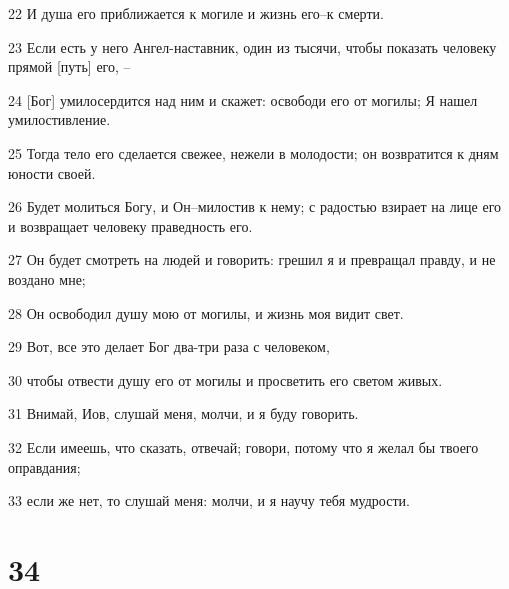 \par 22 И душа его приближается к могиле и жизнь его--к смерти.
\par 23 Если есть у него Ангел-наставник, один из тысячи, чтобы показать человеку прямой [путь] его, --
\par 24 [Бог] умилосердится над ним и скажет: освободи его от могилы; Я нашел умилостивление.
\par 25 Тогда тело его сделается свежее, нежели в молодости; он возвратится к дням юности своей.
\par 26 Будет молиться Богу, и Он--милостив к нему; с радостью взирает на лице его и возвращает человеку праведность его.
\par 27 Он будет смотреть на людей и говорить: грешил я и превращал правду, и не воздано мне;
\par 28 Он освободил душу мою от могилы, и жизнь моя видит свет.
\par 29 Вот, все это делает Бог два-три раза с человеком,
\par 30 чтобы отвести душу его от могилы и просветить его светом живых.
\par 31 Внимай, Иов, слушай меня, молчи, и я буду говорить.
\par 32 Если имеешь, что сказать, отвечай; говори, потому что я желал бы твоего оправдания;
\par 33 если же нет, то слушай меня: молчи, и я научу тебя мудрости.

\chapter{34}

